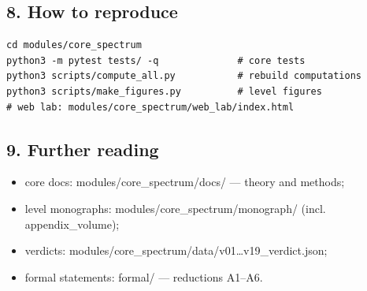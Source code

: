 \documentclass[11pt,a4paper]{article}
\begin{document}
\subsection{8. How to reproduce}

\begin{verbatim}
cd modules/core_spectrum
python3 -m pytest tests/ -q              # core tests
python3 scripts/compute_all.py           # rebuild computations
python3 scripts/make_figures.py          # level figures
# web lab: modules/core_spectrum/web_lab/index.html
\end{verbatim}

\subsection{9. Further reading}

\begin{itemize}
  \item core docs: modules/core\_spectrum/docs/ — theory and methods;
  \item level monographs: modules/core\_spectrum/monograph/ (incl. appendix\_volume);
  \item verdicts: modules/core\_spectrum/data/v01…v19\_verdict.json;
  \item formal statements: formal/ — reductions A1–A6.
\end{itemize}
\end{document}
